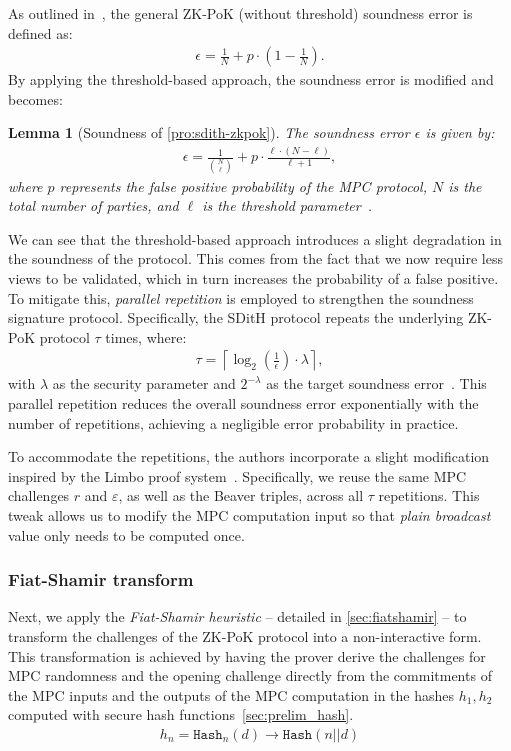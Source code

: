 \documentclass[11pt]{report}
\theoremstyle{definition}
\theoremstyle{plain}
\newtheorem{lemma}{Lemma}[section]
\begin{document}
As outlined in~\cite{feneuil2023threshold}, the general ZK-PoK (without threshold) soundness error is defined as:
\begin{align*}
  \epsilon = \frac{1}{N} + p \cdot \left(1 - \frac{1}{N}\right).
\end{align*}
By applying the threshold-based approach, the soundness error is modified and becomes:
\begin{lemma}[Soundness of \autoref{pro:sdith-zkpok}]
  The soundness error $\epsilon$ is given by:
  \begin{align*}
    \epsilon = \frac{1}{\binom{N}{\ell}} + p \cdot \frac{\ell \cdot (N - \ell)}{\ell + 1},
  \end{align*}
  where $p$ represents the false positive probability of the MPC protocol, $N$ is the total number of parties, and $\ell$ is the threshold parameter~\cite{feneuil2023threshold}.
\end{lemma}
We can see that the threshold-based approach introduces a slight degradation in the soundness of the protocol. This comes from the fact that we now require less views to be validated, which in turn increases the probability of a false positive.
To mitigate this, \textit{parallel repetition} is employed to strengthen the soundness signature protocol. Specifically, the SDitH protocol repeats the underlying ZK-PoK protocol $\tau$ times, where:
\begin{align*}
  \tau = \left\lceil \log_2\left(\frac{1}{\epsilon}\right) \cdot \lambda \right\rceil,
\end{align*}
with $\lambda$ as the security parameter and $2^{-\lambda}$ as the target soundness error~\cite{aguilarsyndrome11}. This parallel repetition reduces the overall soundness error exponentially with the number of repetitions, achieving a negligible error probability in practice.

To accommodate the repetitions, the authors incorporate a slight modification inspired by the Limbo proof system~\cite{delpech2021limbo}. Specifically, we reuse the same MPC challenges $r$ and $\varepsilon$, as well as the Beaver triples, across all $\tau$ repetitions. This tweak allows us to modify the MPC computation input so that \textit{plain broadcast} value only needs to be computed once.

\subsubsection{Fiat-Shamir transform}
Next, we apply the \textit{Fiat-Shamir heuristic} -- detailed in \autoref{sec:fiatshamir} -- to transform the challenges of the ZK-PoK protocol into a non-interactive form. This transformation is achieved by having the prover derive the challenges for MPC randomness and the opening challenge directly from the commitments of the MPC inputs and the outputs of the MPC computation in the hashes $h_1, h_2$ computed with secure hash functions~\autoref{sec:prelim_hash}.
\begin{align}
  h_n = \texttt{Hash}_n(d) \rightarrow \texttt{Hash}(n || d)\label{eq:fiatshamirhash}
\end{align}
\end{document}
